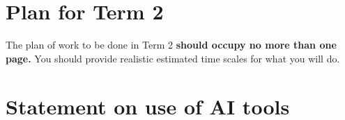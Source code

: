 \documentclass[a4paper,12pt, notitlepage]{article}
\begin{document}
\section{Plan for Term 2}
The plan of work to be done in Term 2 \textbf{should occupy no more than one page.} You should provide realistic estimated time scales for what you will do. 

\section{Statement on use of AI tools}



\end{document}
